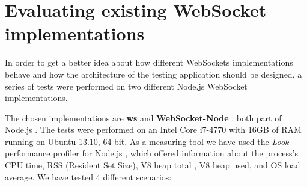\documentclass[conference]{IEEEtran}
\begin{document}
\section{Evaluating existing WebSocket implementations}
In order to get a better idea about how different WebSockets implementations
behave and how the architecture of the testing application should be designed, a
series of tests were performed on two different Node.js WebSocket implementations.

The chosen implementations are \textbf{ws} \cite{nodejs-ws}
and \textbf{WebSocket-Node} \cite{nodejs-websocket}, both part of Node.js
\cite{nodejs}. The tests were performed on an Intel Core i7-4770 with 16GB of
RAM running on Ubuntu 13.10, 64-bit. As a measuring tool we have used the
\textit{Look} performance profiler for Node.js \cite{nodejs-look}, which offered
information about the process's CPU time, RSS (Resident Set Size), V8 heap total
\cite{javascript-v8}, V8 heap used, and OS load average.
\indent
We have tested 4 different scenarios:
\end{document}
